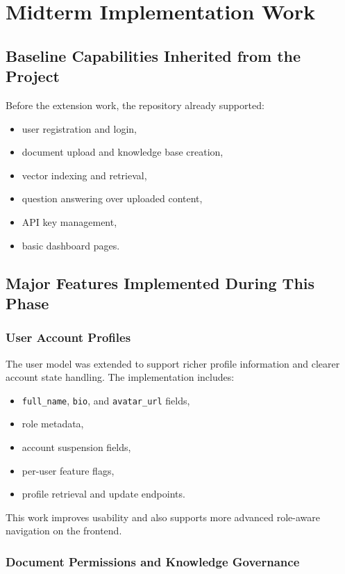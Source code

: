 \documentclass[12pt,a4paper]{report}
\begin{document}
\chapter{Midterm Implementation Work}

\section{Baseline Capabilities Inherited from the Project}

Before the extension work, the repository already supported:
\begin{itemize}[leftmargin=1.5em]
\item user registration and login,
\item document upload and knowledge base creation,
\item vector indexing and retrieval,
\item question answering over uploaded content,
\item API key management,
\item basic dashboard pages.
\end{itemize}

\section{Major Features Implemented During This Phase}

\subsection{User Account Profiles}

The user model was extended to support richer profile information and clearer account state handling. The implementation includes:
\begin{itemize}[leftmargin=1.5em]
\item \texttt{full\_name}, \texttt{bio}, and \texttt{avatar\_url} fields,
\item role metadata,
\item account suspension fields,
\item per-user feature flags,
\item profile retrieval and update endpoints.
\end{itemize}

This work improves usability and also supports more advanced role-aware navigation on the frontend.

\subsection{Document Permissions and Knowledge Governance}
\end{document}

